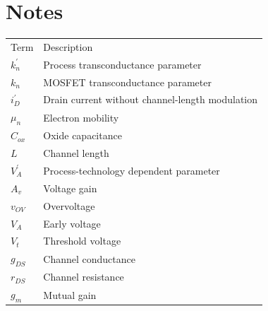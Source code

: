 \documentclass[12pt, letterpaper]{article}
\begin{document}
\section*{Notes}
\begin{tabular}{ l l }
Term & Description \\
$k_n^{\prime}$ & Process transconductance parameter \\
$k_n$ & MOSFET transconductance parameter \\
$i_D^{\prime}$ & Drain current without channel-length modulation \\
$\mu_n$ & Electron mobility \\
$C_{ox}$ & Oxide capacitance \\
$L$ & Channel length \\
$V_A^{\prime}$ & Process-technology dependent parameter \\
$A_v$ & Voltage gain \\
$v_{OV}$ & Overvoltage \\
$V_A$ & Early voltage \\
$V_t$ & Threshold voltage \\
$g_{DS}$ & Channel conductance \\
$r_{DS}$ & Channel resistance \\
$g_m$ & Mutual gain \\
\end{tabular}
\end{document}
